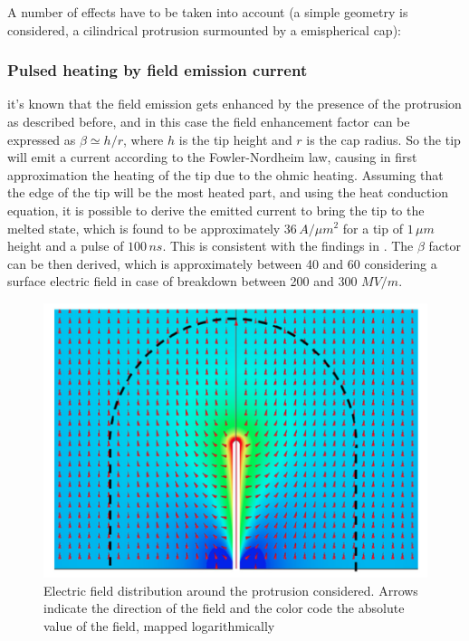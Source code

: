 A number of effects have to be taken into account (a simple geometry is considered, a cilindrical protrusion surmounted by a emispherical cap): 

\subsubsection{Pulsed heating by field emission current}

it's known that the field emission gets enhanced by the presence of the protrusion as described before, and in this case the field enhancement factor can be expressed as $\beta \simeq h/r$, where $h$ is the tip height and $r$ is the cap radius. So the tip will emit a current according to the Fowler-Nordheim law, causing in first approximation the heating of the tip due to the ohmic heating. Assuming that the edge of the tip will be the most heated part, and using the heat conduction equation, it is possible to derive the emitted current to bring the tip to the melted state, which is found to be approximately $36\, A/\mu m^2$ for a tip of $1 \, \mu m$ height and a pulse of $100\, ns$. This is consistent with the findings in \cite{soviet:1983}. The $\beta$ factor can be then derived, which is approximately between 40 and 60 considering a surface electric field in case of breakdown between 200 and 300 $MV/m$.


\begin{figure}[h]
\centering

\includegraphics[scale=0.3]{pictures/field_S_c}
\caption{Electric field distribution around the protrusion considered. Arrows indicate the direction of the field and the color code the absolute value of the field, mapped logarithmically \cite{Grudiev:newLoc} }
\label{kilpPlot}

\end{figure}



